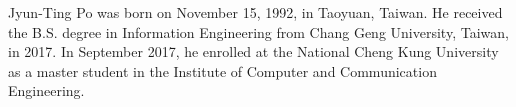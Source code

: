 \documentclass[12pt]{ksthesis}
\begin{document}
\singlespace {\large



}





\doublespace

\begin{vita}
\Thesisspace \large{

Jyun-Ting Po was born on November 15, 1992, in Taoyuan, Taiwan. He received the B.S.
degree in Information Engineering from Chang Geng University, Taiwan, in 2017.
In September 2017, he enrolled at the National Cheng Kung University as a master
student in the Institute of Computer and Communication Engineering.


}\end{vita}
\end{document}
